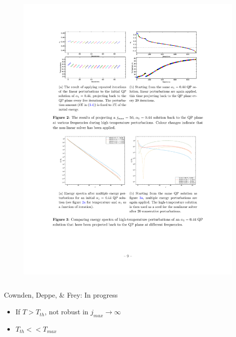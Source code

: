 \documentclass[mathserif,10pt]{beamer}
\newcommand{\bi}{\begin{itemize}}
\newcommand{\ei}{\end{itemize}}
\newcommand{\its}{\item}
\newcommand{\scr}{\scriptsize}
\newcommand{\jm}{j_{max}}
\begin{document}
{\begin{columns}
\begin{figure}
  \includegraphics[scale=0.75]{reop20}
  \end{figure}
  \end{columns}
  \begin{center}
  \vspace{-0.12in}
  {\scr Cownden, Deppe, \& Frey: In progress}
  \end{center}
  \vspace{-0.1in}
  \bi
  \its If $T > T_{th}$, \alert{not robust} in $\jm \to \infty$
  \its $T_{th} << T_{max}$
  \ei
}
\end{document}
